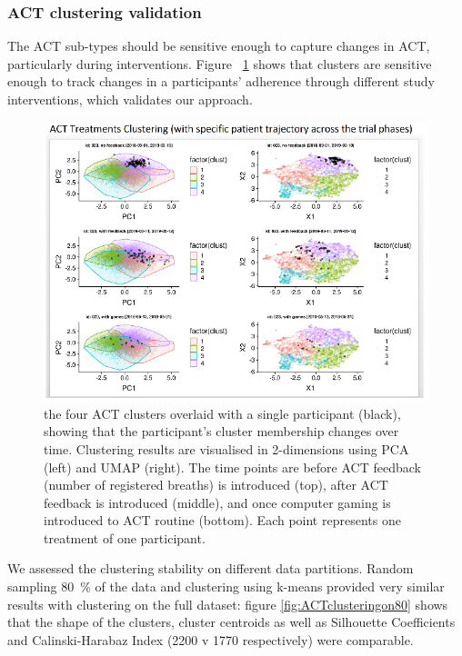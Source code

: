 \documentclass{article}
\begin{document}
\subsubsection{ACT clustering validation}

The ACT sub-types should be sensitive enough to capture changes in ACT, particularly during interventions. Figure ~\ref{fig:act_res} shows that clusters are sensitive enough to track changes in a participants' adherence through different study interventions, which validates our approach.

\begin{figure}[!htb]
  \centering
  \includegraphics[]{fig_ACT_clust}
  \caption{the four ACT clusters overlaid with a single participant (black), showing that the participant’s cluster membership changes over time. Clustering results are visualised in 2-dimensions using PCA (left) and UMAP (right). The time points are before ACT feedback (number of registered breaths) is introduced (top), after ACT feedback is introduced (middle), and once computer gaming is introduced to ACT routine (bottom). Each point represents one treatment of one participant. }
  \label{fig:act_res}
\end{figure}

We assessed the clustering stability on different data partitions. Random sampling 80~\% of the data and clustering using k-means provided very similar results with clustering on the full dataset: figure \ref{fig:ACTclusteringon80} shows that the shape of the clusters, cluster centroids as well as Silhouette Coefficients and Calinski-Harabaz Index (2200 v 1770 respectively) were comparable. 
\end{document}
